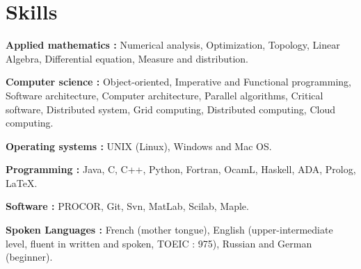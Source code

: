 \documentclass{article}
\renewenvironment{itemize}{
  \begin{list}{}{
      \setlength{\leftmargin}{1.5em}
      \setlength{\itemsep}{0.25em}
      \setlength{\parskip}{0pt}
      \setlength{\parsep}{0.25em}
    }
}{
  \end{list}
}
\begin{document}
\section*{Skills}
\begin{itemize}
	\item \textbf{Applied mathematics :} Numerical analysis, Optimization, Topology, Linear Algebra, Differential equation, Measure and distribution.
	\item \textbf{Computer science :} Object-oriented, Imperative and Functional programming, Software architecture, Computer architecture, Parallel algorithms, Critical software, Distributed system, Grid computing, Distributed computing, Cloud computing.
	\item \textbf{Operating systems :} UNIX (Linux), Windows and Mac OS.
	\item \textbf{Programming :} Java, C, C++, Python, Fortran, OcamL, Haskell, ADA, Prolog, \LaTeX. 
	\item \textbf{Software :} PROCOR, Git, Svn, MatLab, Scilab, Maple.
	\item \textbf{Spoken Languages :} French (mother tongue), English (upper-intermediate level, fluent in written and spoken, TOEIC : 975), Russian and German (beginner).
\end{itemize}  
\end{document}
